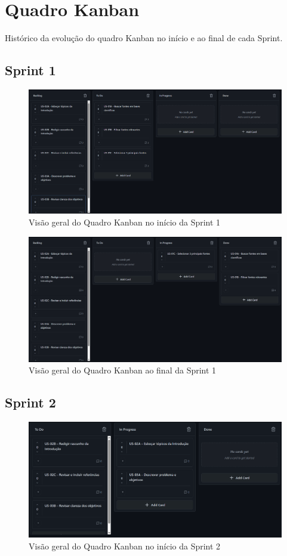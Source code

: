\section{Quadro Kanban}

Histórico da evolução do quadro Kanban no início e ao final de cada Sprint.

\subsection{Sprint 1}

\begin{figure}[htbp]
  \centering
  \includegraphics[width=0.8\linewidth]{pictures/kanban_sprint1_inicio.png}
  \caption{Visão geral do Quadro Kanban no início da Sprint 1}
\end{figure}

\begin{figure}[htbp]
  \centering
  \includegraphics[width=0.8\linewidth]{pictures/kanban_sprint1_final.png}
  \caption{Visão geral do Quadro Kanban ao final da Sprint 1}
\end{figure}

\subsection{Sprint 2}

\begin{figure}[htbp]
  \centering
  \includegraphics[width=0.8\linewidth]{pictures/kanban_sprint2_inicio.png}
  \caption{Visão geral do Quadro Kanban no início da Sprint 2}
\end{figure}

